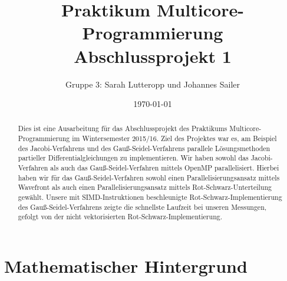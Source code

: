 \documentclass{article}
\title{Praktikum Multicore-Programmierung \\ Abschlussprojekt 1}
\author{Gruppe 3: Sarah Lutteropp und Johannes Sailer}
\date{\today}
\begin{document}
\maketitle


\begin{abstract}
Dies ist eine Ausarbeitung für das Abschlussprojekt des Praktikums Multicore-Programmierung im Wintersemester 2015/16. Ziel des Projektes war es, am Beispiel des Jacobi-Verfahrens und des Gauß-Seidel-Verfahrens parallele Lösungsmethoden partieller Differentialgleichungen zu implementieren. Wir haben sowohl das Jacobi-Verfahren als auch das Gauß-Seidel-Verfahren mittels OpenMP parallelisiert. Hierbei haben wir für das Gauß-Seidel-Verfahren sowohl einen Parallelisierungsansatz mittels Wavefront als auch einen Parallelisierungsansatz mittels Rot-Schwarz-Unterteilung gewählt. Unsere mit SIMD-Instruktionen beschleunigte Rot-Schwarz-Implementierung des Gauß-Seidel-Verfahrens zeigte die schnellste Laufzeit bei unseren Messungen, gefolgt von der nicht vektorisierten Rot-Schwarz-Implementierung.
\end{abstract}

\section{Mathematischer Hintergrund}

%	
\end{document}
